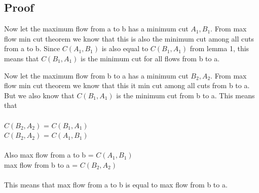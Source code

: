 \documentclass[11pt]{article}
\begin{document}
\subsection{Proof}

Now let the maximum flow from a to b has a minimum cut $A_1,B_1$. From max flow min cut theorem we know that this is also the minimum cut among all cuts from a to b. Since $C(A_1,B_1)$ is also equal to $C(B_1, A_1)$ from lemma 1, this means that $C(B_1, A_1)$ is the minimum cut for all flows from b to a.

Now let the maximum flow from b to a has a minimum cut $B_2,A_2$. From max flow min cut theorem we know that this it min cut among all cuts from b to a. But we also know that $C(B_1, A_1)$ is the minimum cut from b to a. This means that \\\\
$C(B_2, A_2)$ = $C(B_1, A_1)$\\
$C(B_2, A_2)$ = $C(A_1, B_1)$\\\\
Also max flow from a to b = $C(A_1, B_1)$\\
max flow from b to a = $C(B_2, A_2)$\\\\
This means that max flow from a to b is equal to max flow from b to a.
\end{document}
